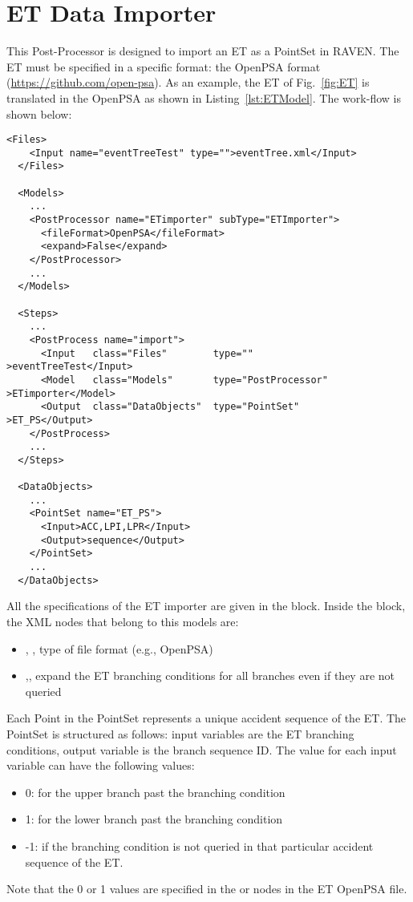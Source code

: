 \section{ET Data Importer}
\label{sec:ETdataImporter}

This Post-Processor is designed to import an ET as a PointSet in RAVEN.
The ET must be specified in a specific format: the OpenPSA format (\href{<url>}{https://github.com/open-psa}). 
As an example, the ET of Fig.~\ref{fig:ET} is translated in the OpenPSA as shown in Listing~\ref{lst:ETModel}.
The work-flow is shown below:

\begin{lstlisting}[style=XML,morekeywords={anAttribute},caption=ET Importer input example., label=lst:ET_PP_InputExample]
  <Files>
    <Input name="eventTreeTest" type="">eventTree.xml</Input>
  </Files>
  
  <Models>
    ...
    <PostProcessor name="ETimporter" subType="ETImporter">
      <fileFormat>OpenPSA</fileFormat>
      <expand>False</expand>
    </PostProcessor> 
    ...  
  </Models>

  <Steps>
    ...
    <PostProcess name="import">
      <Input   class="Files"        type=""                >eventTreeTest</Input>
      <Model   class="Models"       type="PostProcessor"   >ETimporter</Model>
      <Output  class="DataObjects"  type="PointSet"        >ET_PS</Output>
    </PostProcess>
    ...
  </Steps>

  <DataObjects>
    ...
    <PointSet name="ET_PS">
      <Input>ACC,LPI,LPR</Input>
      <Output>sequence</Output>
    </PointSet>
    ...
  </DataObjects>
\end{lstlisting}

All the specifications of the ET importer are given in the 
 block. 
Inside the  block, the XML
nodes that belong to this models are:
\begin{itemize}
  \item  {}, , type of file format (e.g., OpenPSA)
  \item  {},, expand the ET branching conditions for all branches even if they are not queried
\end{itemize}

Each Point in the PointSet represents a unique accident sequence of the ET.
The PointSet is structured as follows: input variables are the ET branching conditions, output variable is the branch sequence ID.
The value for each input variable can have the following values:
\begin{itemize}
  \item 0: for the upper branch past the branching condition  
  \item 1: for the lower branch past the branching condition
  \item -1: if the branching condition is not queried in that particular accident sequence of the ET.
\end{itemize}
Note that the 0 or 1 values are specified in the  or  nodes in the ET OpenPSA file.

